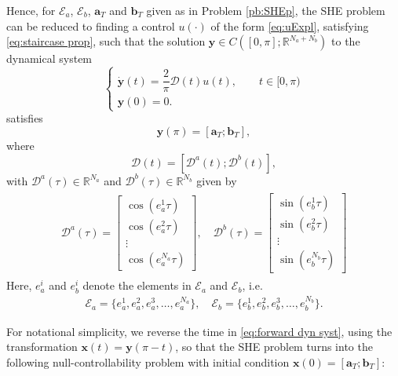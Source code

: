 \documentclass[twocolumn]{autart}    %
\begin{document}
Hence,  for $\mathcal{E}_a$, $\mathcal{E}_b$, $\bm{a}_T$ and $\bm{b}_T$ given as in Problem \ref{pb:SHEp}, the SHE problem can be reduced to finding a control $u(\cdot)$ of the form \eqref{eq:uExpl}, satisfying \eqref{eq:staircase prop}, such that the solution $\bm{y} \in C([0,\pi]; \mathbb{R}^{N_a+N_b})$ to the dynamical system
\begin{equation}
\label{eq:forward dyn syst}
\left\{\begin{array}{l}
\dot{\bm{y}} (t) = \dfrac{2}{\pi} \bm{\mathcal{D}}(t) u(t), \qquad  t\in [0,\pi) \\
\bm{y}(0) = 0.
\end{array}\right.
\end{equation}
satisfies
$$
\bm{y} (\pi) = [\bm{a}_T;\bm{b}_T],
$$
where
\begin{equation}\label{eq:Dynamics}
\bm{\mathcal{D}}(t) = \left[ \bm{\mathcal{D}}^a(t); \bm{\mathcal{D}}^b(t) \right], 
\end{equation}
with $\bm{\mathcal{D}}^a(\tau) \in \mathbb{R}^{N_a} $ and $ \bm{\mathcal{D}}^b(\tau) \in \mathbb{R}^{N_b}$ given by
\begin{gather}\label{eq:DalphaDbeta}
    \begin{align}
        \bm{\mathcal{D}}^a(\tau) = 
        \begin{bmatrix} 
            \cos(e_a^1\tau) \\ \cos(e_a^2\tau) \\ \vdots \\ \cos(e_a^{N_a}\tau) 
        \end{bmatrix},
        \quad \bm{\mathcal{D}}^b(\tau) = 
        \begin{bmatrix} 
            \sin(e_b^1\tau) \\ \sin(e_b^2\tau) \\ \vdots \\ \sin(e_b^{N_b}\tau)
        \end{bmatrix} 
    \end{align} 
\end{gather}
Here, $e_a^i$ and $e_b^i$  denote the elements in $\mathcal{E}_a$ and  $\mathcal{E}_b$, i.e.
\begin{align*}
	\mathcal{E}_a = \{e_a^1,e_a^2,e_a^3,\dots,e_a^{N_a}\}, \quad \mathcal{E}_b = \{e_b^1,e_b^2,e_b^3,\dots,e_b^{N_b}\}.
\end{align*}

For notational simplicity,  we reverse the time in \eqref{eq:forward dyn syst}, using the transformation $\bm{x} (t) = \bm{y}(\pi - t)$, so that the SHE problem turns into the following null-controllability problem with initial condition $\bm{x}(0) = [\bm{a}_T; \bm{b}_T]$:
\end{document}
